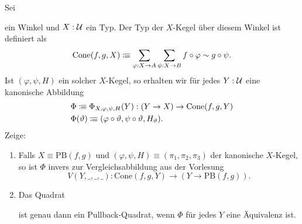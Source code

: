 \documentclass{uebung}
\begin{document}
\begin{bonus}
  Sei
  ein Winkel und $X:\mathcal{U}$ ein Typ.
  Der Typ der $X$-Kegel über diesem Winkel ist definiert als
  $$
  \mathrm{Cone}(f,g,X) \vcentcolon\mspace{-1.2mu}\equiv \sum_{\varphi:X\to A}\sum_{\psi:X\to B} f\circ\varphi \sim g\circ\psi.
  $$
  Ist $(\varphi,\psi,H)$ ein solcher $X$-Kegel, so erhalten wir für jedes $Y:\mathcal{U}$ eine kanonische Abbildung
  \begin{align*}
    &\Phi\vcentcolon\mspace{-1.2mu}\equiv\Phi_{X,\varphi,\psi,H}(Y):(Y \to X) \to \mathrm{Cone}(f,g,Y)\\
    &\Phi(\vartheta)\vcentcolon\mspace{-1.2mu}\equiv (\varphi\circ\vartheta,\psi\circ\vartheta,H_\vartheta).
  \end{align*}
  Zeige:
  \begin{enumerate}
    \item Falls $X\equiv\mathrm{PB}(f,g)$ und $(\varphi,\psi,H)\equiv(\pi_1,\pi_2,\pi_3)$ der kanonische $X$-Kegel, so ist $\Phi$ invers zur Vergleichsabbildung aus der Vorlesung
      $$
      V(Y,\_,\_,\_):\mathrm{Cone}(f,g,Y)\to (Y\to\mathrm{PB}(f,g)).
      $$
    \item Das Quadrat
      \begin{center}
      \end{center}
      ist genau dann ein Pullback-Quadrat, wenn $\Phi$ für jedes $Y$ eine Äquivalenz ist.
  \end{enumerate}
\end{bonus}
\end{document}
